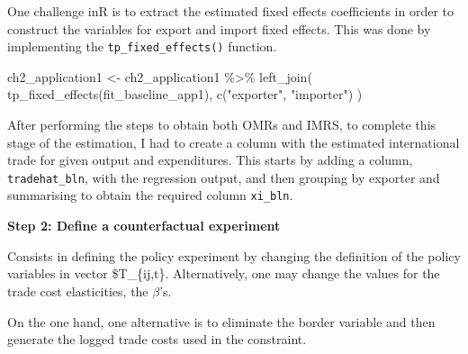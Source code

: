 \documentclass[12pt,reqno,oneside,pdftex]{formato-puc/puctesis} %
\newenvironment{Shaded}{\begin{snugshade}}{\end{snugshade}}
\newcommand{\AttributeTok}[1]{\textcolor[rgb]{0.77,0.63,0.00}{#1}}
\newcommand{\FunctionTok}[1]{\textcolor[rgb]{0.00,0.00,0.00}{#1}}
\newcommand{\NormalTok}[1]{#1}
\newcommand{\OtherTok}[1]{\textcolor[rgb]{0.56,0.35,0.01}{#1}}
\newcommand{\SpecialCharTok}[1]{\textcolor[rgb]{0.00,0.00,0.00}{#1}}
\newcommand{\StringTok}[1]{\textcolor[rgb]{0.31,0.60,0.02}{#1}}
\begin{document}
One challenge inR is to extract the estimated fixed effects coefficients
in order to construct the variables for export and import fixed effects.
This was done by implementing the \texttt{tp\_fixed\_effects()}
function.

\begin{Shaded}
\begin{Highlighting}[]
\NormalTok{ch2\_application1 }\OtherTok{\textless{}{-}}\NormalTok{ ch2\_application1 }\SpecialCharTok{\%\textgreater{}\%}
  \FunctionTok{left\_join}\NormalTok{(}
    \FunctionTok{tp\_fixed\_effects}\NormalTok{(fit\_baseline\_app1),}
    \FunctionTok{c}\NormalTok{(}\StringTok{"exporter"}\NormalTok{, }\StringTok{"importer"}\NormalTok{)}
\NormalTok{  )}
\end{Highlighting}
\end{Shaded}

After performing the steps to obtain both OMRs and IMRS, to complete
this stage of the estimation, I had to create a column with the
estimated international trade for given output and expenditures. This
starts by adding a column, \texttt{tradehat\_bln}, with the regression
output, and then grouping by exporter and summarising to obtain the
required column \texttt{xi\_bln}.

\textbf{Step 2: Define a counterfactual experiment}

Consists in defining the policy experiment by changing the definition of
the policy variables in vector \$T\_\{ij,t\}. Alternatively, one may
change the values for the trade cost elasticities, the \(\beta\)'s.

On the one hand, one alternative is to eliminate the border variable and
then generate the logged trade costs used in the constraint.

\begin{Shaded}
\end{Shaded}
\end{document}
